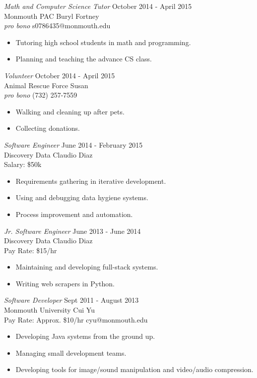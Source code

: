 \documentclass[margin]{res}
\begin{document}
\begin{resume}
	{\sl Math and Computer Science Tutor} \hfill October 2014 - April 2015\\
	Monmouth PAC \hfill Buryl Fortney\\
	{\sl pro bono} \hfill s0786435@monmouth.edu
	\begin{itemize}  \itemsep -2pt
		\item Tutoring high school students in math and programming.
		\item Planning and teaching the advance CS class.
	\end{itemize}

	{\sl Volunteer} \hfill October 2014 - April 2015\\
	Animal Rescue Force \hfill Susan\\
	{\sl pro bono} \hfill (732) 257-7559
	\begin{itemize}  \itemsep -2pt
		\item Walking and cleaning up after pets.
		\item Collecting donations.
	\end{itemize}

	{\sl Software Engineer} \hfill June 2014 - February 2015\\
	Discovery Data \hfill Claudio Diaz\\
	Salary: \$50k \hfill
	\begin{itemize}  \itemsep -2pt
		\item Requirements gathering in iterative development.
		\item Using and debugging data hygiene systems.
		\item Process improvement and automation.
	\end{itemize}
	
	{\sl Jr. Software Engineer} \hfill June 2013 - June 2014 \\
	Discovery Data \hfill Claudio Diaz\\
	Pay Rate: \$15/hr \hfill
	\begin{itemize}  \itemsep -2pt
		\item Maintaining and developing full-stack systems.
		\item Writing web scrapers in Python.
	\end{itemize}
	
	{\sl Software Developer} \hfill Sept 2011 - August 2013 \\
	Monmouth University \hfill Cui Yu\\
	Pay Rate: Approx. \$10/hr \hfill cyu@monmouth.edu
	\begin{itemize}  \itemsep -2pt
		\item Developing Java systems from the ground up.
		\item Managing small development teams.
		\item Developing tools for image/sound manipulation and video/audio compression.
	\end{itemize}
	

\end{resume}
\end{document}
